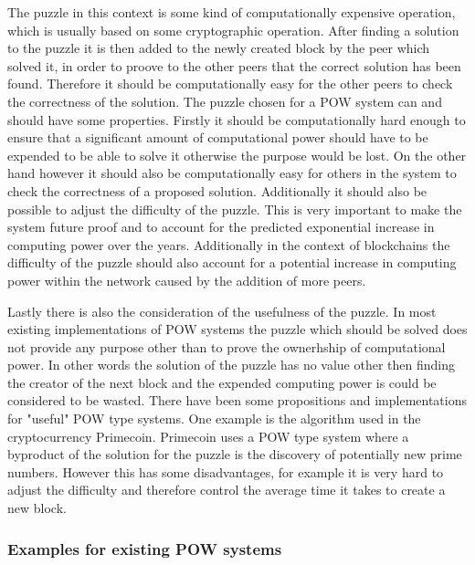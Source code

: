 The puzzle in this context is some kind of computationally expensive operation, which is usually based on some cryptographic operation. After finding a solution to the puzzle it is then added to the
newly created block by the peer which solved it, in order to proove to the other peers that the correct solution has been found. Therefore it should be computationally easy for the other peers to
check the correctness of the solution. The puzzle chosen for a POW system can and should have some properties. Firstly it should be computationally hard enough to ensure that a significant amount of
computational power should have to be expended to be able to solve it otherwise the purpose would be lost. On the other hand however it should also be computationally easy for others in the system to
check the correctness of a proposed solution. Additionally it should also be possible to adjust the difficulty of the puzzle. This is very important to make the system future proof and to account for
the predicted exponential increase in computing power over the years.\cite{url:moore_law} Additionally in the context of blockchains the difficulty of the puzzle should also account for a potential
increase in computing power within the network caused by the addition of more peers.\par Lastly there is also the consideration of the usefulness of the puzzle. In most existing implementations of POW
systems the puzzle which should be solved does not provide any purpose other than to prove the ownerhship of computational power. In other words the solution of the puzzle has no value other then
finding the creator of the next block and the expended computing power is could be considered to be wasted.\cite{url:pow_useless} There have been some propositions and implementations for "useful" POW
type systems. One example is the algorithm used in the cryptocurrency Primecoin. Primecoin uses a POW type system where a byproduct of the solution for the puzzle is the discovery of potentially new
prime numbers.\cite{url:primecoin} However this has some disadvantages, for example it is very hard to adjust the difficulty and therefore control the average time it takes to create a new block.

\subsubsection{Examples for existing POW systems}

